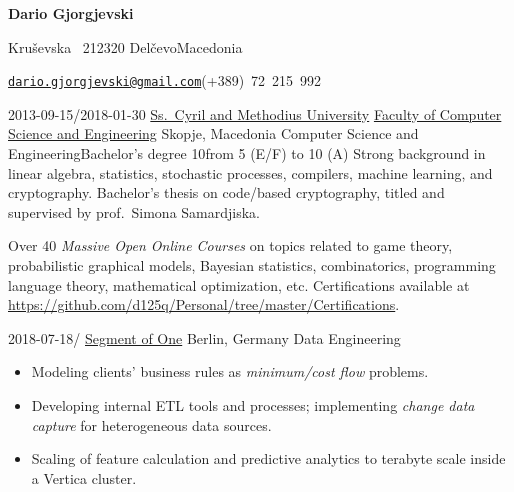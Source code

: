 \documentclass[version=last, paper=A4, DIV=12, toc=bibliography]{scrartcl}%
\begin{document}
\begin{addmargin}{.2\textwidth}
  \begin{center}
    \LARGE\bfseries Dario Gjorgjevski
  \end{center}
  \begin{flushleft}
    \begin{description}[noitemsep, leftmargin=*]
    \item[\faHome] Kruševska \textnumero~21\hfill\textbullet\hfill 2320
      Delčevo\hfill\textbullet\hfill Macedonia
    \item[\faAddressCard] \href{mailto:dario.gjorgjevski@gmail.com}%
      {\nolinkurl{dario.gjorgjevski@gmail.com}}\hfill (+389)~72~215~992
    \end{description}
  \end{flushleft}
\end{addmargin}

\label{sec:education}

\EducationEntry%
{2013-09-15/2018-01-30}%
{\href{http://ukim.edu.mk/}{Ss.\ Cyril and Methodius University}}%
{\href{https://finki.ukim.mk/}{Faculty of Computer Science and Engineering}}%
{Skopje, Macedonia}%
{Computer Science and Engineering}{Bachelor's degree}%
{10}{from 5 (E/F) to 10 (A)}%
{%
  Strong background in linear algebra, statistics, stochastic processes,
  compilers, machine learning, and cryptography.  Bachelor's thesis on
  code\-/based cryptography, titled  and supervised by prof.\
  Simona Samardjiska.%
}

\begin{tcolorbox}[size=fbox, fontupper=\small, fontlower=\footnotesize]
  Over \num{40} \emph{Massive Open Online Courses} on topics related to game
  theory, probabilistic graphical models, Bayesian statistics, combinatorics,
  programming language theory, mathematical optimization, etc.%
  \tcblower%
  Certifications available at
  \url{https://github.com/d125q/Personal/tree/master/Certifications}.
\end{tcolorbox}

\label{sec:experience}

\WorkEntry%
{2018-07-18/}%
{\href{https://www.so1.ai/en/}{Segment of One}}%
{Berlin, Germany}%
{Data Engineering}%
{%
  \begin{itemize}[noitemsep, leftmargin=*]
  \item Modeling clients' business rules as \emph{minimum\-/cost flow} problems.
  \item Developing internal ETL tools and processes; implementing
    \emph{change data capture} for heterogeneous data sources.
  \item Scaling of feature calculation and predictive analytics to
    terabyte scale inside a Vertica cluster.
  \end{itemize}
}
\end{document}
